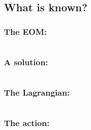 \subsection*{What is known?}

\subsubsection*{The EOM:}
\begin{equation}

\end{equation}

\subsubsection*{A solution:}
\begin{equation}

\end{equation}

\subsubsection*{The Lagrangian:}
\begin{equation}

\end{equation}

\subsubsection*{The action:}
\begin{equation}

\end{equation}
